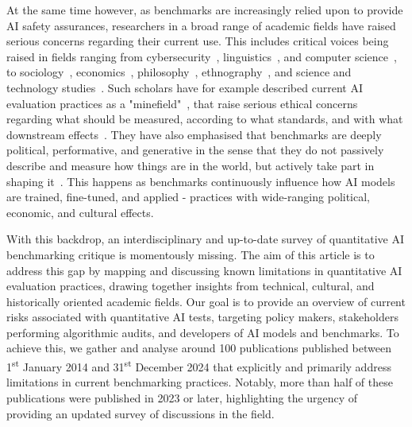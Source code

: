 At the same time however, as benchmarks are increasingly relied upon to provide AI safety assurances, researchers in a broad range of academic fields have raised serious concerns regarding their current use.
This includes critical voices being raised in fields ranging from cybersecurity~\cite{mcintosh2024}, linguistics~\cite{bowman2021}, and computer science~\cite{gema2024}, to sociology~\cite{engdahl2024}, economics~\cite{ethayarajh2021}, philosophy~\cite{lacroix2022}, ethnography~\cite{keyes2022}, and science and technology studies~\cite{keyes2022}.
Such scholars have for example described current AI evaluation practices as a "minefield"~\cite{narayanan2023a}, that raise serious ethical concerns regarding what should be measured, according to what standards, and with what downstream effects~\cite{blili-hamelin2023}.
They have also emphasised that benchmarks are deeply political, performative, and generative in the sense that they do not passively describe and measure how things are in the world, but actively take part in shaping it~\cite{grill2024}. 
This happens as benchmarks continuously influence how AI models are trained, fine-tuned, and applied - practices with wide-ranging political, economic, and cultural effects.

With this backdrop, an interdisciplinary and up-to-date survey of quantitative AI benchmarking critique is momentously missing. The aim of this article is to address this gap by mapping and discussing known limitations in quantitative AI evaluation practices, drawing together insights from technical, cultural, and historically oriented academic fields. Our goal is to provide an overview of current risks associated with quantitative AI tests, targeting policy makers, stakeholders performing algorithmic audits, and developers of AI models and benchmarks. To achieve this, we gather and analyse around 100 publications published between 1\textsuperscript{st} January 2014 and 31\textsuperscript{st} December 2024 that explicitly and primarily address limitations in current benchmarking practices. Notably, more than half of these publications were published in 2023 or later, highlighting the urgency of providing an updated survey of discussions in the field.

